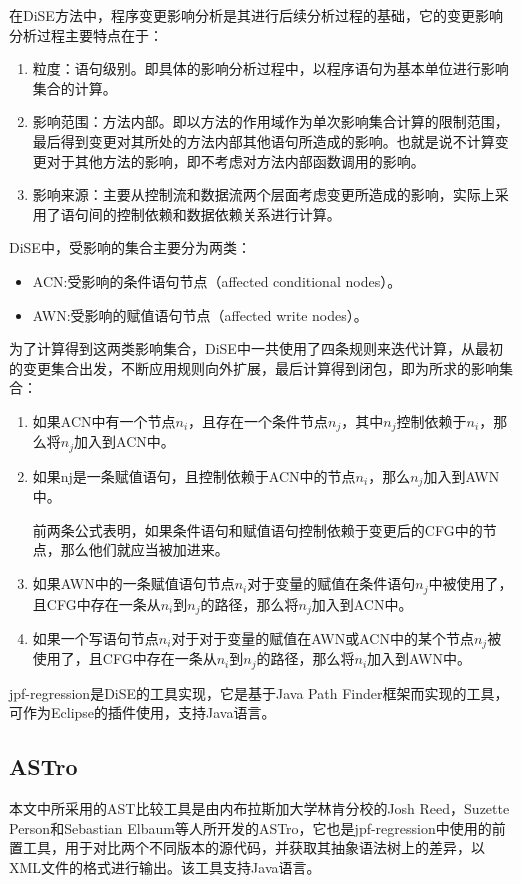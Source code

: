 在DiSE方法中，程序变更影响分析是其进行后续分析过程的基础，它的变更影响分析过程主要特点在于：
\begin{enumerate}
	\item 粒度：语句级别。即具体的影响分析过程中，以程序语句为基本单位进行影响集合的计算。
	\item 影响范围：方法内部。即以方法的作用域作为单次影响集合计算的限制范围，最后得到变更对其所处的方法内部其他语句所造成的影响。也就是说不计算变更对于其他方法的影响，即不考虑对方法内部函数调用的影响。
	\item 影响来源：主要从控制流和数据流两个层面考虑变更所造成的影响，实际上采用了语句间的控制依赖和数据依赖关系进行计算。
\end{enumerate}

DiSE中，受影响的集合主要分为两类：
\begin{itemize}
	\item ACN:受影响的条件语句节点（affected conditional nodes）。
	\item AWN:受影响的赋值语句节点（affected write nodes）。
\end{itemize}

为了计算得到这两类影响集合，DiSE中一共使用了四条规则来迭代计算，从最初的变更集合出发，不断应用规则向外扩展，最后计算得到闭包，即为所求的影响集合：
\begin{enumerate}
	\item 如果ACN中有一个节点$n_i$，且存在一个条件节点$n_j$，其中$n_j$控制依赖于$n_i$，那么将$n_j$加入到ACN中。
	\item 如果nj是一条赋值语句，且控制依赖于ACN中的节点$n_i$，那么$n_j$加入到AWN中。
	     
	前两条公式表明，如果条件语句和赋值语句控制依赖于变更后的CFG中的节点，那么他们就应当被加进来。
	     
	\item 如果AWN中的一条赋值语句节点$n_i$对于变量的赋值在条件语句$n_j$中被使用了，且CFG中存在一条从$n_i$到$n_j$的路径，那么将$n_j$加入到ACN中。

	\item 如果一个写语句节点$n_i$对于对于变量的赋值在AWN或ACN中的某个节点$n_j$被使用了，且CFG中存在一条从$n_i$到$n_j$的路径，那么将$n_i$加入到AWN中。

\end{enumerate}

jpf-regression是DiSE的工具实现，它是基于Java Path Finder框架\cite{havelund2000model}而实现的工具，可作为Eclipse的插件使用，支持Java语言。

\subsection{ASTro}	

	本文中所采用的AST比较工具是由内布拉斯加大学林肯分校的Josh Reed，Suzette Person和Sebastian Elbaum等人所开发的ASTro，它也是jpf-regression中使用的前置工具，用于对比两个不同版本的源代码，并获取其抽象语法树上的差异，以XML文件的格式进行输出。该工具支持Java语言。
	